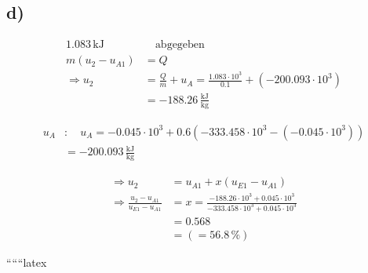 

\subsection*{d)}

\begin{align*}
1.083 \, \text{kJ} & \quad \text{abgegeben} \\
m (u_2 - u_{A1}) &= Q \\
\Rightarrow u_2 &= \frac{Q}{m} + u_A = \frac{1.083 \cdot 10^3}{0.1} + (-200.093 \cdot 10^3) \\
&= -188.26 \, \frac{\text{kJ}}{\text{kg}}
\end{align*}

\begin{align*}
u_A &: \quad u_A = -0.045 \cdot 10^3 + 0.6 \left( -333.458 \cdot 10^3 - (-0.045 \cdot 10^3) \right) \\
&= -200.093 \, \frac{\text{kJ}}{\text{kg}}
\end{align*}

\begin{align*}
\Rightarrow u_2 &= u_{A1} + x \left( u_{E1} - u_{A1} \right) \\
\Rightarrow \frac{u_2 - u_{A1}}{u_{E1} - u_{A1}} &= x = \frac{-188.26 \cdot 10^3 + 0.045 \cdot 10^3}{-333.458 \cdot 10^3 + 0.045 \cdot 10^3} \\
&= 0.568 \\
&= ( = 56.8 \, \%)
\end{align*}

``````latex